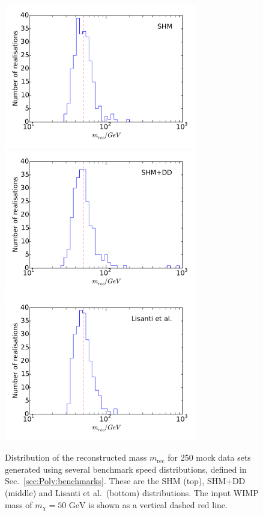 \begin{figure}
\centering
  \includegraphics[trim=0cm 1cm 0cm 0.5cm,clip=true,width=0.75\textwidth]{Poly/SHM_ensemble.pdf}
  \includegraphics[trim=0cm 1cm 0cm 0.5cm,clip=true,width=0.75\textwidth]{Poly/DD_ensemble.pdf}
  \includegraphics[trim=0cm 1cm 0cm 0.5cm,clip=true,width=0.75\textwidth]{Poly/LIS_ensemble.pdf}
  \caption{Distribution of the reconstructed mass $m_\textrm{rec}$ for 250 mock data sets generated using several benchmark speed distributions, defined in Sec.~\ref{sec:Poly:benchmarks}. These are the SHM (top), SHM+DD (middle) and Lisanti et al.\ (bottom) distributions. The input WIMP mass of $m_\chi = 50 \textrm{ GeV}$ is shown as a vertical dashed red line.}
  \label{fig:Poly:Realisations}
\end{figure}

